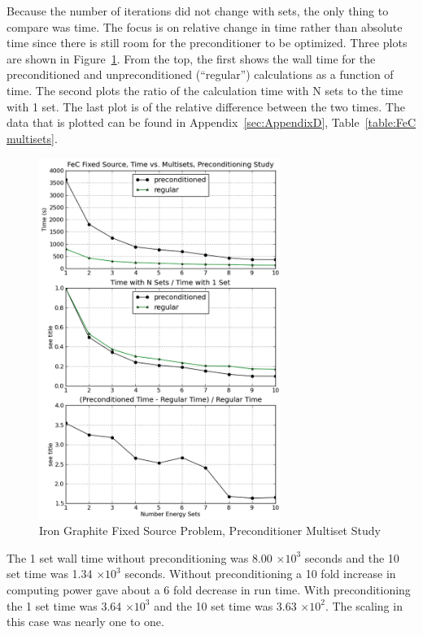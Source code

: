 Because the number of iterations did not change with sets, the only thing to compare was time. The focus is on relative change in time rather than absolute time since there is still room for the preconditioner to be optimized. Three plots are shown in Figure~\ref{fig:FeC multisets}. From the top, the first shows the wall time for the preconditioned and unpreconditioned (``regular'') calculations as a function of time. The second plots the ratio of the calculation time with N sets to the time with 1 set. The last plot is of the relative difference between the two times. The data that is plotted can be found in Appendix~\ref{sec:AppendixD}, Table~\ref{table:FeC multisets}.
%
\begin{figure}[!ht]
    \begin{center}
      \includegraphics [width=0.7\textwidth, height=0.8\textheight] {FeCmultisets}
   \end{center}
   \caption{Iron Graphite Fixed Source Problem, Preconditioner Multiset Study}
   \label{fig:FeC multisets}
\end{figure}

The 1 set wall time without preconditioning was 8.00 $\times 10^{3}$ seconds and the 10 set time was 1.34 $\times 10^{3}$ seconds. Without preconditioning a 10 fold increase in computing power gave about a 6 fold decrease in run time. With preconditioning the 1 set time was 3.64 $\times 10^{3}$ and the 10 set time was 3.63 $\times 10^{2}$. The scaling in this case was nearly one to one.

